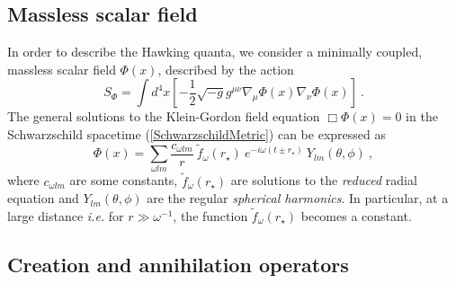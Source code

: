 \documentclass[aps,twocolumn,showpacs]{revtex4}
\def\rstar{r_{\star}}
\begin{document}
\subsection{Massless scalar field}

In order to describe the Hawking quanta, we consider a minimally coupled, 
massless scalar field $\Phi(x)$, described by the action
%
\begin{equation}\label{ScalarActionFull}
S_{\Phi} = \int d^{4}x \left[ -\frac{1}{2} \sqrt{-g} 
g^{\mu \nu} \nabla_{\mu}\Phi(x) \nabla_{\nu}\Phi(x) \right] ~.
\end{equation}
%
The general solutions to the Klein-Gordon field equation $\Box \Phi(x) = 0$ 
in the Schwarzschild spacetime (\ref{SchwarzschildMetric}) can be expressed as
%
\begin{equation}\label{ScalarFieldSolutionFull}
\Phi(x) = \sum_{\omega l m} \frac{c_{\omega lm}}{r}~ 
\tilde{f}_{\omega}(\rstar)~ e^{-i\omega(t\pm\rstar)} ~ Y_{lm}(\theta,\phi) ~,
\end{equation}
%
where $c_{\omega lm}$ are some constants, $\tilde{f}_{\omega}(\rstar)$ are 
solutions to the \emph{reduced} radial equation and $Y_{lm}(\theta,\phi)$ are 
the regular \emph{spherical harmonics}. In particular, at a large distance 
\emph{i.e.} for $r \gg \omega^{-1}$, the function $\tilde{f}_{\omega}(\rstar)$ 
becomes a constant.


\subsection{Creation and annihilation operators}
\end{document}
